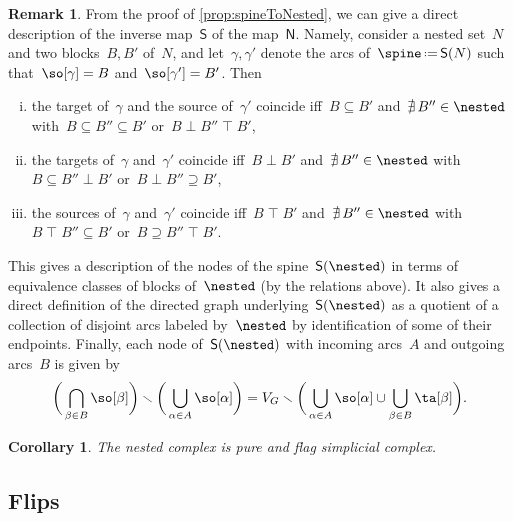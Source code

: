 \documentclass{amsart}
\newtheorem{corollary}[theorem]{Corollary}
\theoremstyle{definition}
\newtheorem{remark}[theorem]{Remark}
\newcommand{\ssm}{\smallsetminus} %
\newcommand{\eqdef}{\mbox{\,\raisebox{0.2ex}{\scriptsize\ensuremath{\mathrm:}}\ensuremath{=}\,}} %
\newcommand{\negDisjoint}{\perp} %
\newcommand{\posDisjoint}{\;\top\;} %
\newcommand{\spineToNested}{\mathsf{N}} %
\newcommand{\nestedToSpine}{\mathsf{S}} %
\begin{document}
\begin{remark}
  \label{rem:nestedToSpine}
  From the proof of \cref{prop:spineToNested}, we can give a direct description of the inverse map~$\nestedToSpine$ of the map~$\spineToNested$.
  Namely, consider a nested set~$N$ and two blocks~$B, B'$ of~$N$, and let~$\gamma, \gamma'$ denote the arcs of~$\spine \eqdef \nestedToSpine(N)$ such that~$\so[\gamma] = B$ and~$\so[\gamma'] = B'$.
  Then
  \begin{enumerate}[(i)]
    \item the target of~$\gamma$ and the source of~$\gamma'$ coincide iff~$B \subseteq B'$ and~$\nexists \, B'' \in \nested$ with~$B \subseteq B'' \subseteq B'$ or~$B \negDisjoint B'' \posDisjoint B'$,
    \item the targets of~$\gamma$ and~$\gamma'$ coincide iff~$B \negDisjoint B'$ and~$\nexists \, B'' \in \nested$ with~$B \subseteq B'' \negDisjoint B'$ or~${B \negDisjoint B'' \supseteq B'}$,
\item the sources of~$\gamma$ and~$\gamma'$ coincide iff~$B \posDisjoint B'$ and~$\nexists \, B'' \in \nested$ with~$B \posDisjoint B'' \subseteq B'$ or~${B \supseteq B'' \posDisjoint B'}$.
\end{enumerate}
This gives a description of the nodes of the spine~$\nestedToSpine(\nested)$ in terms of equivalence classes of blocks of~$\nested$ (by the relations above). It also gives a direct definition of the directed graph underlying~$\nestedToSpine(\nested)$ as a quotient of a collection of disjoint arcs labeled by~$\nested$ by identification of some of their endpoints. Finally, each node of~$\nestedToSpine(\nested)$ with incoming arcs~$A$ and outgoing arcs~$B$ is given by
\[
\bigg( \bigcap_{\beta \in B} \so[\beta] \bigg) \ssm \bigg( \bigcup_{\alpha \in A} \so[\alpha] \bigg) = V_G \ssm \bigg( \bigcup_{\alpha \in A} \so[\alpha] \cup \bigcup_{\beta \in B} \ta[\beta] \bigg).
\]
\end{remark}

\begin{corollary}
  The nested complex is pure and flag simplicial complex.
\end{corollary}


\subsection{Flips}
\end{document}
